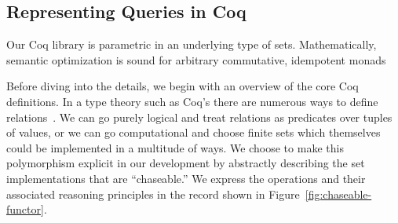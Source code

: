 \documentclass[preprint]{sigplanconf}
\begin{document}
\subsection{Representing Queries in Coq}
Our Coq library is parametric in an underlying type of sets.  Mathematically, semantic optimization is sound for arbitrary commutative, idempotent monads 

Before diving into the details, we begin with an overview of the core Coq definitions.
In a type theory such as Coq's there are numerous ways to define relations~\cite{}.
We can go purely logical and treat relations as predicates over tuples of values, or we can go computational and choose finite sets which themselves could be implemented in a multitude of ways.
We choose to make this polymorphism explicit in our development by abstractly describing the set implementations that are ``chaseable.''
We express the operations and their associated reasoning principles in the record shown in Figure~\ref{fig:chaseable-functor}.
\end{document}

